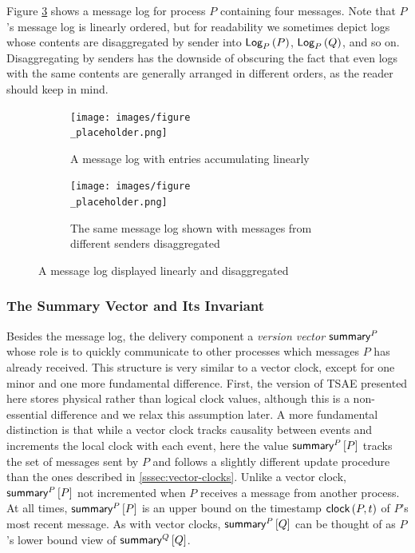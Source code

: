 \documentclass[]             %
{NASA}                       %
\theoremstyle{definition}
\begin{document}
Figure \ref{fig:message-log} shows a message log for process $P$
containing four messages. Note that $P$'s message log is linearly
ordered, but for readability we sometimes depict logs whose contents
are disaggregated by sender into $\textsf{Log}_{P}\left(P\right)$, $\textsf{Log}_{P}\left(Q\right)$, and so
on. Disaggregating by senders has the downside of obscuring the fact
that even logs with the same contents are generally arranged in
different orders, as the reader should keep in mind.

\begin{figure}
  \setlength\belowcaptionskip{0ex}
  \begin{subfigure}{1\textwidth}
    \centering
    \texttt{[image: images/figure\\\_placeholder.png]}
    \caption{A message log with entries accumulating linearly}
    \label{fig:message-log-a}
  \end{subfigure}
  \begin{subfigure}{1\textwidth}
    \centering
    \texttt{[image: images/figure\\\_placeholder.png]}
    \caption{The same message log shown with messages from different senders disaggregated}
    \label{fig:message-log-b}
  \end{subfigure}
  \caption{A message log displayed linearly and disaggregated}
  \label{fig:message-log}
\end{figure}


\subsubsection{The Summary Vector and Its Invariant}
\label{sssec:tsae-summary-vectors}
Besides the message log, the delivery component a \emph{version
  vector} $\textsf{summary}^{P}$ whose role is to quickly communicate to
other processes which messages $P$ has already received. This
structure is very similar to a vector clock, except for one minor and
one more fundamental difference. First, the version of TSAE presented
here stores physical rather than logical clock values, although this
is a non-essential difference and we relax this assumption later. A
more fundamental distinction is that while a vector clock tracks
causality between events and increments the local clock with each
event, here the value $\textsf{summary}^{P}\left[P\right]$ tracks the set of messages sent
by $P$ and follows a slightly different update procedure than the ones
described in \ref{sssec:vector-clocks}. Unlike a vector clock,
$\textsf{summary}^{P}\left[P\right]$ not incremented when $P$ receives a message from
another process. At all times, $\textsf{summary}^{P}\left[P\right]$ is an upper bound on
the timestamp $\textsf{clock}\left(P,t\right)$ of $P$'s most recent message. As with
vector clocks, $\textsf{summary}^{P}\left[Q\right]$ can be thought of as $P$'s lower bound
view of $\textsf{summary}^{Q}\left[Q\right]$.
\end{document}
